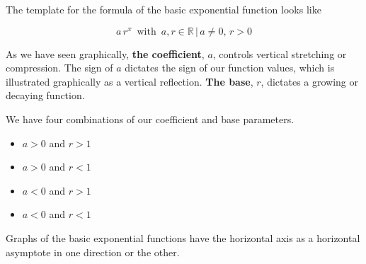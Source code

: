 \documentclass{ximera}
\begin{document}
The template for the formula of the basic exponential function looks like




\[  a \, r^x   \, \text{ with } \,  a, r \in \mathbb{R} \, | \,  a \ne 0, \, r > 0   \]


As we have seen graphically, \textbf{\textcolor{purple!85!blue}{the coefficient}}, $a$, controls vertical stretching or compression. The sign of $a$ dictates the sign of our function values, which is illustrated graphically as a vertical reflection. \textbf{\textcolor{purple!85!blue}{The base}}, $r$, dictates a growing or decaying function.




We have four combinations of our coefficient and base parameters.

\begin{itemize}
\item $a>0$ and $r>1$
\item $a>0$ and $r<1$
\item $a<0$ and $r>1$
\item $a<0$ and $r<1$
\end{itemize}


Graphs of the basic exponential functions have the horizontal axis as a horizontal asymptote in one direction or the other.
\end{document}
